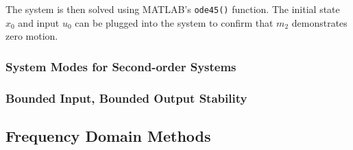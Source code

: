 \documentclass[../notes.tex]{subfiles}
\begin{document}
The system is then solved using MATLAB's \verb|ode45()| function. The initial state $x_0$ and input $u_0$ can be plugged into the system to confirm that $m_2$ demonstrates zero motion.

\subsubsection{System Modes for Second-order Systems}
\subsubsection{Bounded Input, Bounded Output Stability}

\subsection{Frequency Domain Methods}
\end{document}

